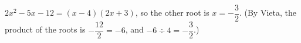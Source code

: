 $2x^2-5x-12=(x-4)(2x+3)$, so the other root is $x=\boxed{-\dfrac32}$. (By Vieta, the product of the roots is $-\dfrac{12}{2}=-6$, and $-6\div4=-\dfrac32$.)

